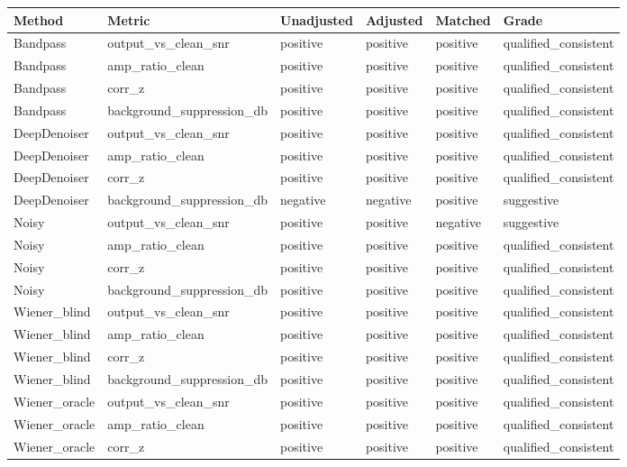 \begin{tabular}{llllll}
\toprule
Method & Metric & Unadjusted & Adjusted & Matched & Grade \\
\midrule
Bandpass & output\_vs\_clean\_snr & positive & positive & positive & qualified\_consistent \\
Bandpass & amp\_ratio\_clean & positive & positive & positive & qualified\_consistent \\
Bandpass & corr\_z & positive & positive & positive & qualified\_consistent \\
Bandpass & background\_suppression\_db & positive & positive & positive & qualified\_consistent \\
DeepDenoiser & output\_vs\_clean\_snr & positive & positive & positive & qualified\_consistent \\
DeepDenoiser & amp\_ratio\_clean & positive & positive & positive & qualified\_consistent \\
DeepDenoiser & corr\_z & positive & positive & positive & qualified\_consistent \\
DeepDenoiser & background\_suppression\_db & negative & negative & positive & suggestive \\
Noisy & output\_vs\_clean\_snr & positive & positive & negative & suggestive \\
Noisy & amp\_ratio\_clean & positive & positive & positive & qualified\_consistent \\
Noisy & corr\_z & positive & positive & positive & qualified\_consistent \\
Noisy & background\_suppression\_db & positive & positive & positive & qualified\_consistent \\
Wiener\_blind & output\_vs\_clean\_snr & positive & positive & positive & qualified\_consistent \\
Wiener\_blind & amp\_ratio\_clean & positive & positive & positive & qualified\_consistent \\
Wiener\_blind & corr\_z & positive & positive & positive & qualified\_consistent \\
Wiener\_blind & background\_suppression\_db & positive & positive & positive & qualified\_consistent \\
Wiener\_oracle & output\_vs\_clean\_snr & positive & positive & positive & qualified\_consistent \\
Wiener\_oracle & amp\_ratio\_clean & positive & positive & positive & qualified\_consistent \\
Wiener\_oracle & corr\_z & positive & positive & positive & qualified\_consistent \\

\end{tabular}
